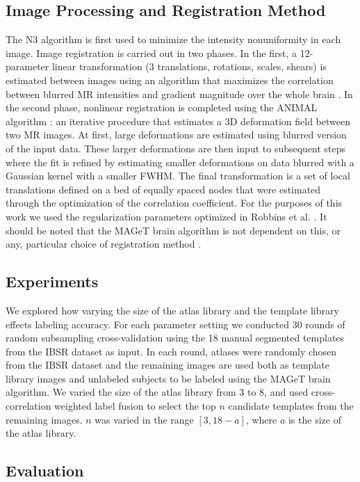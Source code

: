 \documentclass{article}\usepackage{graphicx, color}
\begin{document}
\subsection{Image Processing and Registration Method}
The N3 algorithm \citep{Sled1998} is first used to minimize the intensity
nonuniformity in each image.  Image registration is carried out in two phases.
In the first, a 12-parameter linear transformation (3 translations, rotations,
scales, shears) is estimated between images using an algorithm that maximizes
the correlation between blurred MR intensities and gradient magnitude over the
whole brain \citep{Collins}.  In the second phase, nonlinear registration is
completed using the ANIMAL algorithm \citep{Collins1995}: an iterative procedure
that estimates a 3D deformation field between two MR images. At first, large
deformations are estimated using blurred version of the input data. These
larger deformations are then input to subsequent steps where the fit is refined
by estimating smaller deformations on data blurred with a Gaussian kernel with
a smaller FWHM. The final transformation is a set of local translations defined
on a bed of equally spaced nodes that were estimated through the optimization
of the correlation coefficient. For the purposes of this work we used the
regularization parameters optimized in Robbins et al. \citep{Robbins2004}. It
should be noted that the MAGeT brain algorithm is not dependent on this, or
any, particular choice of registration method \citep{Chakravarty2012}.

\subsection{Experiments}

We explored how varying the size of the atlas library and the template library
effects labeling accuracy.  For each parameter setting we conducted 30 rounds
of random subsampling cross-validation using the 18 manual segmented templates
from the IBSR dataset as input. In each round, atlases were randomly chosen
from the IBSR dataset and the remaining images are used both as template
library images and unlabeled subjects to be labeled using the MAGeT brain
algorithm.  We varied the size of the atlas library from 3 to 8, and used
cross-correlation weighted label fusion to select the top $n$ candidate
templates from the remaining images.  $n$ was varied in the range $[3, 18-a]$,
where $a$ is the size of the atlas library.

\subsection{Evaluation}
\end{document}

